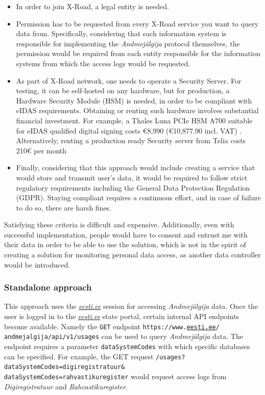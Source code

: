 \begin{itemize}
    \item {In order to join X-Road, a legal entity is needed.}
    \item {Permission has to be requested from every X-Road service you want to query data from. Specifically, considering that each information system is responsible for implementing the \textit{Andmejälgija} protocol themselves, the permission would be required from each entity responsible for the information systems from which the access logs would be requested.}
    \item {As part of X-Road network, one needs to operate a Security Server. For testing, it can be self-hosted on any hardware, but for production, a Hardware Security Module (HSM) is needed, in order to be compliant with eIDAS requirements. Obtaining or renting such hardware involves substantial financial investment. For example, a Thales Luna PCIe HSM A700 suitable for eIDAS qualified digital signing costs €8,990 (€10,877.90 incl. VAT) \cite{thales-luna-hsm-pricing}. Alternatively, renting a production ready Security server from Telia costs 210€ per month \cite{telia-xroad-server}}
    \item {Finally, considering that this approach would include creating a service that would store and transmit user's data, it would be required to follow strict regulatory requirements including the General Data Protection Regulation (GDPR). Staying compliant requires a continuous effort, and in case of failure to do so, there are harsh fines.}
\end{itemize}

Satisfying these criteria is difficult and expensive. Additionally, even with successful implementation, people would have to consent and entrust me with their data in order to be able to use the solution, which is not in the spirit of creating a solution for monitoring personal data access, as another data controller would be introduced.

\subsubsection{Standalone approach}
This approach uses the \textit{\href{https://www.eesti.ee}{eesti.ee}} session for accessing \textit{Andmejälgija} data. Once the user is logged in to the \textit{\href{https://www.eesti.ee}{eesti.ee}} state portal, certain internal API endpoints become available. Namely the \texttt{GET} endpoint \texttt{https://www.\href{https://www.eesti.ee}{eesti.ee}/\\andmejalgija/api/v1/usages} can be used to query \textit{Andmejälgija} data. The endpoint requires a parameter \texttt{dataSystemCodes} with which specific databases can be specified. For example, the GET request \texttt{/usages?dataSystemCodes=digiregistratuur\&\\dataSystemCodes=rahvastikuregister} would request access logs from \textit{Digiregistratuur} and \textit{Rahvastikuregister}.

